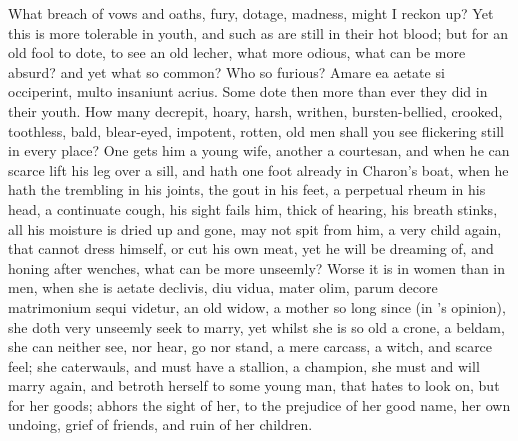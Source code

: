 What breach of vows and oaths, fury, dotage, madness, might I reckon
up? Yet this is more tolerable in youth, and such as are still in their
hot blood; but for an old fool to dote, to see an old lecher, what more
odious, what can be more absurd? and yet what so common? Who so
furious? Amare ea aetate si occiperint, multo insaniunt acrius.
Some dote then more than ever they did in their youth. How many
decrepit, hoary, harsh, writhen, bursten-bellied, crooked, toothless,
bald, blear-eyed, impotent, rotten, old men shall you see flickering
still in every place? One gets him a young wife, another a courtesan,
and when he can scarce lift his leg over a sill, and hath one foot
already in Charon's boat, when he hath the trembling in his joints, the
gout in his feet, a perpetual rheum in his head, a continuate cough,
his sight fails him, thick of hearing, his breath stinks, all his
moisture is dried up and gone, may not spit from him, a very child
again, that cannot dress himself, or cut his own meat, yet he will be
dreaming of, and honing after wenches, what can be more unseemly? Worse
it is in women than in men, when she is aetate declivis, diu vidua,
mater olim, parum decore matrimonium sequi videtur, an old widow, a
mother so long since (in \Pliny{}'s opinion), she doth very unseemly
seek to marry, yet whilst she is so old a crone, a beldam, she
can neither see, nor hear, go nor stand, a mere carcass, a witch,
and scarce feel; she caterwauls, and must have a stallion, a champion,
she must and will marry again, and betroth herself to some young man,
that hates to look on, but for her goods; abhors the sight of
her, to the prejudice of her good name, her own undoing, grief of
friends, and ruin of her children.

